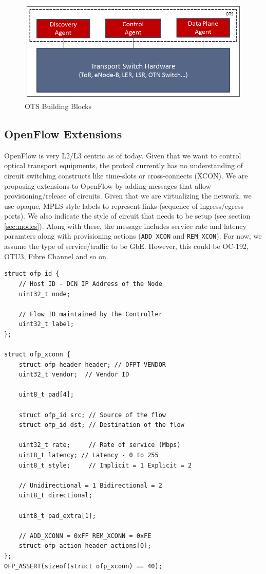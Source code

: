 \documentclass{sig-alternate-10pt}
\begin{document}
	\begin{figure}[htb]
	\centering
	\includegraphics[scale=0.37]{OTSArch.png}
	\caption{OTS Building Blocks}
	\label{fig:OTSArch}
	\end{figure}

	\subsection{OpenFlow Extensions}
	\label{sec:ofext}
	
	OpenFlow \cite{OF1.0} is very L2/L3 centric as of today. Given that we want to control optical transport
	equipments, the protcol currently has no understanding of circuit switching constructs like time-slots or
	cross-connects (XCON). We are proposing extensions to OpenFlow by adding messages that allow provisioning/release of
	circuits. Given that we are virtualizing the network, we use opaque, MPLS-style labels to represent links
	(sequence of ingress/egress ports). We also indicate the style of circuit that needs to be setup (see
	section \ref{sec:modes}). Along with these, the message includes service rate and latency paramters along
	with provisioning actions (\texttt{ADD\_XCON} and \texttt{REM\_XCON}). For now, we assume the type of service/traffic 
	to be GbE. However, this could be OC-192, OTU3, Fibre Channel and so on.

	\begin{lstlisting}
struct ofp_id {
	// Host ID - DCN IP Address of the Node
	uint32_t node;

	// Flow ID maintained by the Controller
	uint32_t label;
};

struct ofp_xconn {
	struct ofp_header header; // OFPT_VENDOR
	uint32_t vendor;  // Vendor ID

	uint8_t pad[4];
		  
	struct ofp_id src; // Source of the flow
	struct ofp_id dst; // Destination of the flow
		   
	uint32_t rate;     // Rate of service (Mbps)
	uint8_t latency; // Latency - 0 to 255
	uint8_t style;     // Implicit = 1 Explicit = 2

	// Unidirectional = 1 Bidirectional = 2
	uint8_t directional;

	uint8_t pad_extra[1];

	// ADD_XCONN = 0xFF REM_XCONN = 0xFE
	struct ofp_action_header actions[0];
};
OFP_ASSERT(sizeof(struct ofp_xconn) == 40);
	\end{lstlisting}
	
\end{document}
